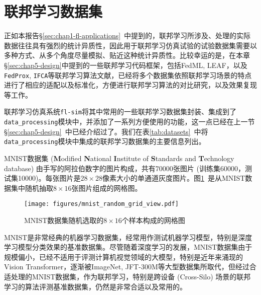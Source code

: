 \section{联邦学习数据集}
\label{sec:chap5-datasets}


正如本报告\S\ref{sec:chap1-fl-applications}~中提到的，联邦学习所涉及、处理的实际数据往往具有强烈的统计异质性，因此用于联邦学习仿真试验的试验数据集需要以多种方式、从多个角度尽量模拟、贴近这种统计异质性。比较幸运的是，在本章\S\ref{sec:chap5-design}中提到的一些联邦学习代码框架，包括FedML\cite{he_2020_fedml}, LEAF\cite{caldas2018_leaf}，以及\texttt{FedProx}\cite{sahu2018fedprox}, \texttt{IFCA}\cite{Ghosh_2022_cfl}等联邦学习算法文献，已经将多个数据集依照联邦学习场景的特点进行了相应的适配以及标准化，方便进行联邦学习算法的对比研究，以及效果复现等工作。

联邦学习仿真系统\texttt{fl-sim}将其中常用的一些联邦学习数据集封装、集成到了\texttt{data\_processing}模块中，并添加了一系列方便使用的功能，这一点已经在上一节\S\ref{sec:chap5-design}~中已经介绍过了。我们在表\ref{tab:datasets}~中将\texttt{data\_processing}模块中集成的联邦学习数据集的主要信息列出。



MNIST数据集 (\textbf{M}odified \textbf{N}ational \textbf{I}nstitute of \textbf{S}tandards and \textbf{T}echnology database) \cite{Lecun_1998_mnist}由手写的阿拉伯数字的图片构成，共有70000张图片 (训练集60000，测试集10000)。每张图片是$28\times 28$像素大小的单通道灰度图片。图\ref{fig:mnist_random_grid_view}~是从MNIST数据集中随机抽取$8\times 16$张图片组成的网格图。

\begin{figure}[ht]
\centering
\texttt{[image: figures/mnist\_random\_grid\_view.pdf]}
\caption{MNIST数据集随机选取的$8\times 16$个样本构成的网格图}
\label{fig:mnist_random_grid_view}
\end{figure}

MNIST是非常经典的机器学习数据集，经常用作测试机器学习模型，特别是深度学习模型分类效果的基准数据集。尽管随着深度学习的发展，MNIST数据集由于规模偏小，已经不适用于评测计算机视觉领域的大模型，特别是近年来涌现的Vision Transformer\cite{dosovitskiy2021_vit}，逐渐被ImageNet\cite{deng2009imagenet}, JFT-300M\cite{Sun_2017_JFT-300M}等大型数据集所取代，但经过合适处理\cite{mcmahan2017fed_avg, caldas2018_leaf, sahu2018fedprox}的MNIST数据集，作为联邦学习，特别是跨设备 (Cross-Silo) 场景的联邦学习的算法评测基准数据集，仍然是非常合适以及常用的\cite{reddi2020fed_opt, tran2021feddr, Ghosh_2022_cfl, li2021pfedmac, t2020pfedme}。

